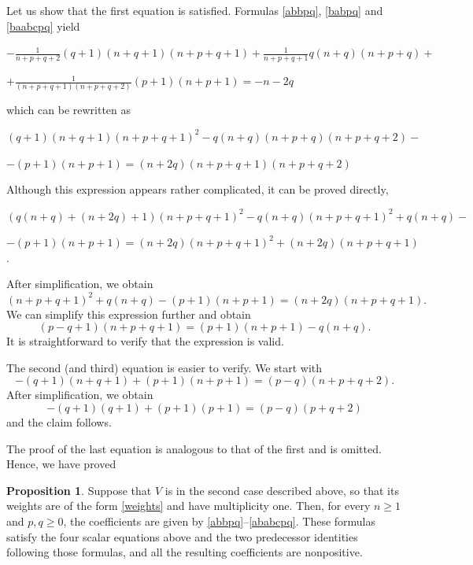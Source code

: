 \documentclass[twoside,a4paper,12pt]{article}
\theoremstyle{definition}
\newtheorem{proposition}{Proposition}
\newcommand{\ds}{\displaystyle}
\begin{document}
Let us show that the first equation is satisfied. Formulas \eqref{abbpq},
\eqref{babpq} and \eqref{baabcpq} yield
\begin{flushleft}
	$\ds -\frac1{n+p+q+2}(q+1)(n+q+1)(n+p+q+1)+\frac1{n+p+q+1}q(n+q)(n+p+q)+$
\end{flushleft}
\begin{flushright}
	$\ds +\frac1{(n+p+q+1)(n+p+q+2)}(p+1)(n+p+1)=-n-2q$
\end{flushright}
which can be rewritten as
\begin{flushleft}
	$\ds (q+1)(n+q+1)(n+p+q+1)^2-q(n+q)(n+p+q)(n+p+q+2)-$
\end{flushleft}
\begin{flushright}
	$\ds -(p+1)(n+p+1)=(n+2q)(n+p+q+1)(n+p+q+2)$
\end{flushright}
Although this expression appears rather complicated, it can be proved directly,
\begin{flushleft}
	$\ds (q(n+q)+(n+2q)+1)(n+p+q+1)^2-q(n+q)(n+p+q+1)^2+q(n+q)-$
\end{flushleft}
\begin{flushright}
	$\ds -(p+1)(n+p+1)=(n+2q)(n+p+q+1)^2+(n+2q)(n+p+q+1)$.
\end{flushright}
After simplification, we obtain
\begin{equation*}
	(n+p+q+1)^2+q(n+q)-(p+1)(n+p+1)=(n+2q)(n+p+q+1).
\end{equation*}
We can simplify this expression further and obtain
\begin{equation*}
	(p-q+1)(n+p+q+1)=(p+1)(n+p+1)-q(n+q).
\end{equation*}
It is straightforward to verify that the expression is valid.

The second (and third) equation is easier to verify. We start with
\begin{equation*}
	-(q+1)(n+q+1)+(p+1)(n+p+1)=(p-q)(n+p+q+2).
\end{equation*}
After simplification, we obtain
\begin{equation*}
	-(q+1)(q+1)+(p+1)(p+1)=(p-q)(p+q+2)
\end{equation*}
and the claim follows.

The proof of the last equation is analogous to that of the first and is omitted.
Hence, we have proved

\begin{proposition}
	Suppose that $V$ is in the second case described above, so that its weights
	are of the form \eqref{weights} and have multiplicity one. Then, for every
	$n\geq1$ and $p,q\geq0$, the coefficients are given by
	\eqref{abbpq}--\eqref{ababcpq}. These formulas satisfy the four scalar
	equations above and the two predecessor identities following those formulas,
	and all the resulting coefficients are nonpositive.
\end{proposition}
\end{document}
